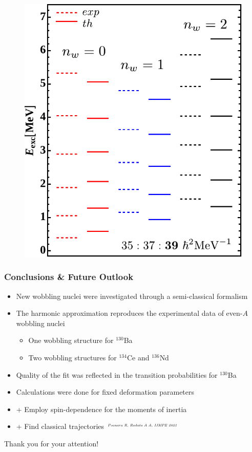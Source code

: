 \documentclass{beamer}
\begin{document}
\begin{frame}
\begin{itemize}
\begin{figure}
    \includegraphics[scale=0.44]{Figs/136Nd-excitation-higher-edited.pdf}
  \end{figure}
\end{itemize}
\end{frame}

\begin{frame}
  \frametitle{Conclusions \& Future Outlook}
  \begin{itemize}
    \item New wobbling nuclei were investigated through a semi-classical formalism
    \item The harmonic approximation reproduces the experimental data of even-$A$ wobbling nuclei
    \begin{itemize}
      \item One wobbling structure for $^{130}$Ba
      \item Two wobbling structures for $^{134}$Ce and $^{136}$Nd 
    \end{itemize}
    \item Quality of the fit was reflected in the transition probabilities for $^{130}$Ba
    \item Calculations were done for fixed deformation parameters
    \item + Employ spin-dependence for the moments of inertia 
    \item + Find classical trajectories $^\text{\tiny\emph{Poenaru R, Raduta A A, IJMPE 2021}}$
  \end{itemize}
\end{frame}

\begin{frame}
  \begin{center}
    \Large Thank you for your attention!
  \end{center}
\end{frame}

\end{document}
